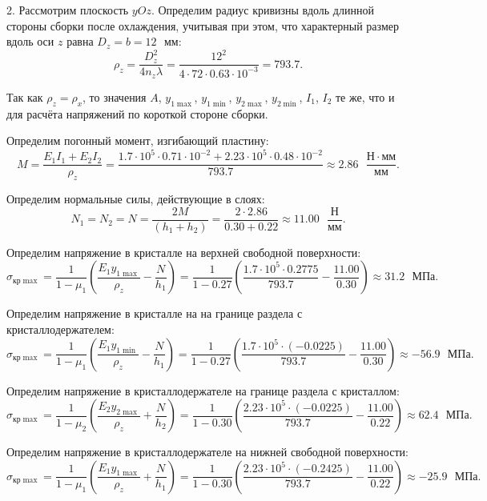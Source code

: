 2. Рассмотрим плоскость $yOz$. Определим радиус кривизны вдоль длинной стороны сборки после охлаждения, учитывая при этом, что характерный размер вдоль оси $z$ равна $D_z = b = 12 \text{ } мм$:
\[
    \rho_z = \frac{D_z^2}{4 n_z \lambda}
           = \frac{12^2}{4 \cdot 72 \cdot 0.63 \cdot 10^{-3}}
           = 793.7.
\]

Так как $\rho_z = \rho_x$, то значения $A$, $y_{1 \max}$, $y_{1 \min}$, $y_{2 \max}$, $y_{2 \min}$, $I_1$, $I_2$ те же, что и для расчёта напряжений по короткой стороне сборки.

Определим погонный момент, изгибающий пластину:
\[
    M = \frac{E_1 I_1 + E_2 I_2}{\rho_z}
      = \frac{1.7 \cdot 10^5 \cdot 0.71 \cdot 10^{-2} + 2.23 \cdot 10^5 \cdot 0.48 \cdot 10^{-2}}{793.7}
      \approx 2.86 \text{ } \frac{Н \cdot мм}{мм}.
\]

Определим нормальные силы, действующие в слоях:
\[
    N_1 = N_2 = N
        = \frac{2M}{(h_1 + h_2)}
        = \frac{2 \cdot 2.86}{0.30 + 0.22}
        \approx 11.00 \text{ } \frac{Н}{мм}.
\]

Определим напряжение в кристалле на верхней свободной поверхности:
\[
    \sigma_{кр \max} = \frac{1}{1 - \mu_1} \left(\frac{E_1 y_{1\max}}{\rho_z} - \frac{N}{h_1}\right)
                     = \frac{1}{1 - 0.27} \left(\frac{1.7 \cdot 10^5 \cdot 0.2775}{793.7} - \frac{11.00}{0.30}\right)
                     \approx 31.2 \text{ } МПа.
\]

Определим напряжение в кристалле на на границе раздела с кристаллодержателем:
\[
    \sigma_{кр \max} = \frac{1}{1 - \mu_1} \left(\frac{E_1 y_{1\min}}{\rho_z} - \frac{N}{h_1}\right)
                     = \frac{1}{1 - 0.27} \left(\frac{1.7 \cdot 10^5 \cdot (-0.0225)}{793.7} - \frac{11.00}{0.30}\right)
                     \approx -56.9\text{ } МПа.
\]

Определим напряжение в кристаллодержателе на границе раздела с кристаллом:
\[
    \sigma_{кр \max} = \frac{1}{1 - \mu_2} \left(\frac{E_2 y_{2\max}}{\rho_z} + \frac{N}{h_2}\right)
                     = \frac{1}{1 - 0.30} \left(\frac{2.23 \cdot 10^5 \cdot (-0.0225)}{793.7} - \frac{11.00}{0.22}\right)
                     \approx 62.4\text{ } МПа.
\]

Определим напряжение в кристаллодержателе на нижней свободной поверхности:
\[
    \sigma_{кр \max} = \frac{1}{1 - \mu_1} \left(\frac{E_1 y_{1\max}}{\rho_z} + \frac{N}{h_1}\right)
                     = \frac{1}{1 - 0.30} \left(\frac{2.23 \cdot 10^5 \cdot (-0.2425)}{793.7} - \frac{11.00}{0.22}\right)
                     \approx -25.9\text{ } МПа.
\]

